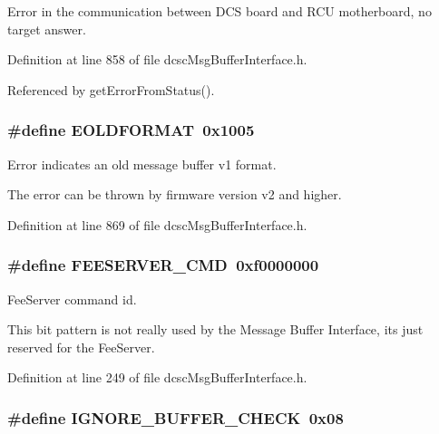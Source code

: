 Error in the communication between DCS board and RCU motherboard, no target answer. 



Definition at line 858 of file dcsc\-Msg\-Buffer\-Interface.h.

Referenced by get\-Error\-From\-Status().\hypertarget{group__dcsc__msg__buffer__access_g78f0a660b0b99a94de586d9174999492}{
\subsubsection[EOLDFORMAT]{\setlength{\rightskip}{0pt plus 5cm}\#define EOLDFORMAT~0x1005}}
\label{group__dcsc__msg__buffer__access_g78f0a660b0b99a94de586d9174999492}


Error indicates an old message buffer v1 format. 

The error can be thrown by firmware version v2 and higher. 

Definition at line 869 of file dcsc\-Msg\-Buffer\-Interface.h.\hypertarget{group__dcsc__msg__buffer__access_g4922cdfb6125eef890c22cadeb1a4522}{
\subsubsection[FEESERVER\_\-CMD]{\setlength{\rightskip}{0pt plus 5cm}\#define FEESERVER\_\-CMD~0xf0000000}}
\label{group__dcsc__msg__buffer__access_g4922cdfb6125eef890c22cadeb1a4522}


Fee\-Server command id. 

This bit pattern is not really used by the Message Buffer Interface, its just reserved for the Fee\-Server. 

Definition at line 249 of file dcsc\-Msg\-Buffer\-Interface.h.\hypertarget{group__dcsc__msg__buffer__access_g4115ae88155913f9a07bfbbd995f5e4f}{
\subsubsection[IGNORE\_\-BUFFER\_\-CHECK]{\setlength{\rightskip}{0pt plus 5cm}\#define IGNORE\_\-BUFFER\_\-CHECK~0x08}}
\label{group__dcsc__msg__buffer__access_g4115ae88155913f9a07bfbbd995f5e4f}


